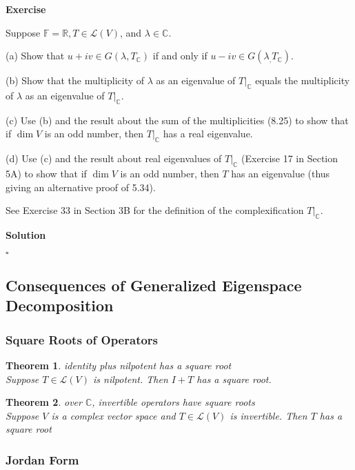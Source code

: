 \documentclass{article}
\newtheorem{theorem}{Theorem}[subsection]
\newenvironment{exercise}{%
{\textbf{Exercise\\}
    }
}{
}
\newenvironment{solution}{%
{
    \textbf{Solution\\}
    }
}{
  \hfill $\square$ 
  \par\bigskip 
}
\newcommand{\RR}{\mathbb{R}}
\newcommand{\CC}{\mathbb{C}}
\newcommand{\FF}{\mathbb{F}}
\begin{document}
\begin{CJK}{UTF8}{gkai}
\begin{exercise}
    Suppose $\FF = \RR,T \in\mathcal{L}(V)$, and $\lambda \in \CC$.

    (a) Show that $u +iv \in G(\lambda,T_{\CC})$ if and only if $u-iv \in G(\lambda_
    , T_{\CC})$.

    (b) Show that the multiplicity of $\lambda$ as an eigenvalue of $T|_{\CC}$ equals the multiplicity of $\lambda$ as an eigenvalue of $T|_{\CC}$.

    (c) Use (b) and the result about the sum of the multiplicities (8.25) to show that if $\dim V$ is an odd number, then $T|_{\CC}$ has a real eigenvalue.

    (d) Use (c) and the result about real eigenvalues of $T|_{\CC}$ (Exercise 17 in Section 5A) to show that if $\dim V$ is an odd number, then $T$ has an eigenvalue (thus giving an alternative proof of 5.34).

    See Exercise 33 in Section 3B for the definition of the complexification $T|_{\CC}$.
\end{exercise}

\begin{solution}
    
\end{solution}
\subsection{Consequences of Generalized Eigenspace Decomposition}

\subsubsection{Square Roots of Operators}

\begin{theorem}
    identity plus nilpotent has a square root\\

    Suppose $T \in \mathcal{L}(V)$ is nilpotent. Then $I + T$ has a square root.
\end{theorem}

\begin{theorem}
    over $\CC$, invertible operators have square roots\\

    Suppose $V$ is a complex vector space and $T \in \mathcal{L}(V)$ is invertible. Then $T$ has a square root
\end{theorem}
\subsubsection{Jordan Form}


\end{CJK}
\end{document}
